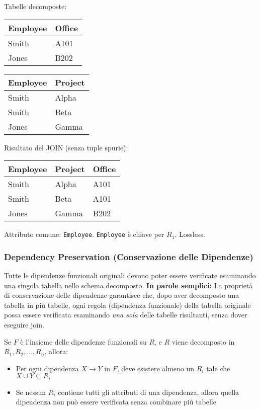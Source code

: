 \noindent Tabelle decomposte:
\begin{center}
\begin{tabular}{|l|l|}
	\hline
	\textbf{Employee} & \textbf{Office} \\ \hline
	Smith & A101 \\ \hline
	Jones & B202 \\ \hline
\end{tabular}
\quad
\begin{tabular}{|l|l|}
	\hline
	\textbf{Employee} & \textbf{Project} \\ \hline
	Smith & Alpha \\ \hline
	Smith & Beta \\ \hline
	Jones & Gamma \\ \hline
\end{tabular}
\end{center}

\noindent Risultato del JOIN (senza tuple spurie):
\begin{center}
\begin{tabular}{|l|l|l|}
	\hline
	\textbf{Employee} & \textbf{Project} & \textbf{Office} \\ \hline
	Smith & Alpha & A101 \\ \hline
	Smith & Beta & A101 \\ \hline
	Jones & Gamma & B202 \\ \hline
\end{tabular}
\end{center}

\noindent Attributo comune: \texttt{Employee}. \texttt{Employee} è chiave per $R_1$. Lossless.

\subsubsection{Dependency Preservation (Conservazione delle Dipendenze)}
Tutte le dipendenze funzionali originali devono poter essere verificate esaminando una singola tabella nello schema decomposto.
\newline
\newline
\textbf{In parole semplici:} La proprietà di conservazione delle dipendenze garantisce che, dopo aver decomposto una tabella in più tabelle, ogni regola (dipendenza funzionale) della tabella originale possa essere verificata esaminando \textit{una sola} delle tabelle risultanti, senza dover eseguire join.

Se $F$ è l'insieme delle dipendenze funzionali su $R$, e $R$ viene decomposto in $R_1, R_2, \ldots, R_n$, allora:
\begin{itemize}
	\item Per ogni dipendenza $X \rightarrow Y$ in $F$, deve esistere almeno un $R_i$ tale che $X \cup Y \subseteq R_i$
	\item Se nessun $R_i$ contiene tutti gli attributi di una dipendenza, allora quella dipendenza non può essere verificata senza combinare più tabelle
\end{itemize}

